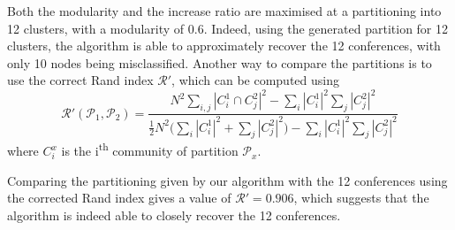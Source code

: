 \documentclass[12pt]{article}
\theoremstyle{definition}
\begin{document}
Both the modularity and the increase ratio are maximised at a partitioning into 12 clusters, with a modularity of 0.6. Indeed, using the generated partition for 12 clusters, the algorithm is able to approximately recover the 12 conferences, with only 10 nodes being misclassified. Another way to compare the partitions is to use the correct Rand index $\mathcal{R'}$, which can be computed using
\[
\mathcal{R'}(\mathcal{P}_1,\mathcal{P}_2) = \frac{N^2 \sum_{i,j} |C_i^1 \cap C_j^2|^2 - \sum_i |C_i^1|^2 \sum_j |C_j^2|^2}{\frac{1}{2}N^2\big( \sum_i |C_i^1|^2 + \sum_j |C_j^2|^2\big) - \sum_i |C_i^1|^2 \sum_j |C_j^2|^2}
\]
where $C_i^x$ is the i\textsuperscript{th} community of partition $\mathcal{P}_x$.

Comparing the partitioning given by our algorithm with the 12 conferences using the corrected Rand index gives a value of $\mathcal{R'} = 0.906$, which suggests that the algorithm is indeed able to closely recover the 12 conferences.


\end{document}
